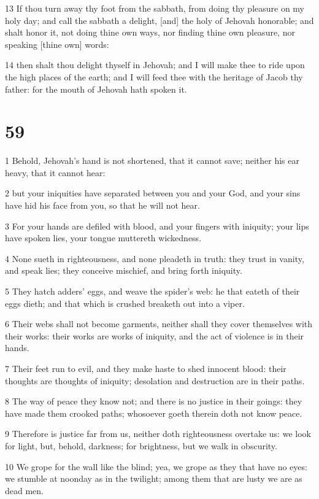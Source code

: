 \par 13 If thou turn away thy foot from the sabbath, from doing thy pleasure on my holy day; and call the sabbath a delight, [and] the holy of Jehovah honorable; and shalt honor it, not doing thine own ways, nor finding thine own pleasure, nor speaking [thine own] words:
\par 14 then shalt thou delight thyself in Jehovah; and I will make thee to ride upon the high places of the earth; and I will feed thee with the heritage of Jacob thy father: for the mouth of Jehovah hath spoken it.

\chapter{59}

\par 1 Behold, Jehovah's hand is not shortened, that it cannot save; neither his ear heavy, that it cannot hear:
\par 2 but your iniquities have separated between you and your God, and your sins have hid his face from you, so that he will not hear.
\par 3 For your hands are defiled with blood, and your fingers with iniquity; your lips have spoken lies, your tongue muttereth wickedness.
\par 4 None sueth in righteousness, and none pleadeth in truth: they trust in vanity, and speak lies; they conceive mischief, and bring forth iniquity.
\par 5 They hatch adders' eggs, and weave the spider's web: he that eateth of their eggs dieth; and that which is crushed breaketh out into a viper.
\par 6 Their webs shall not become garments, neither shall they cover themselves with their works: their works are works of iniquity, and the act of violence is in their hands.
\par 7 Their feet run to evil, and they make haste to shed innocent blood: their thoughts are thoughts of iniquity; desolation and destruction are in their paths.
\par 8 The way of peace they know not; and there is no justice in their goings: they have made them crooked paths; whosoever goeth therein doth not know peace.
\par 9 Therefore is justice far from us, neither doth righteousness overtake us: we look for light, but, behold, darkness; for brightness, but we walk in obscurity.
\par 10 We grope for the wall like the blind; yea, we grope as they that have no eyes: we stumble at noonday as in the twilight; among them that are lusty we are as dead men.
